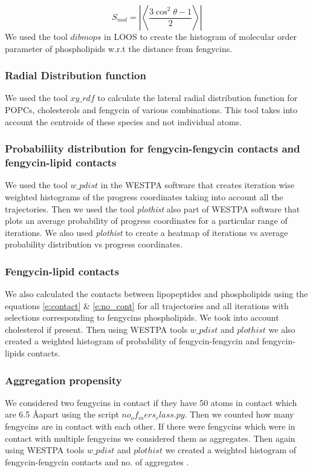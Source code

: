 \begin{equation}
\label{e:s_mol}
    S_{mol} = \left | \left \langle \frac{3 \cos^2 \theta -1}{2} \right \rangle \right |
\end{equation}
We used the tool ${dibmops}$ in LOOS to create the histogram of molecular order parameter of phospholipids w.r.t the distance from fengycins.

\subsubsection{Radial Distribution function}
\label{sss:rdf}
We used the tool ${xy\_rdf}$ to calculate the lateral radial distribution function for POPCs, cholesterols and fengycin of various combinations. This tool takes into account the centroids of these species and not individual atoms.

\subsubsection{Probabiliity distribution for fengycin-fengycin contacts and fengycin-lipid contacts}
\label{sss:prog_coord}
We used the tool ${w\_pdist}$ in the WESTPA software that creates 
iteration wise weighted histograms of the progress coordinates taking 
into account all the trajectories. Then we used the tool 
\textit{plothist} also part of WESTPA software that plots an average 
probability of progress coordinates  for a particular range of 
iterations. We also used \textit{plothist} to create a heatmap of 
iterations vs average probability distribution vs progress coordinates.

\subsubsection{Fengycin-lipid contacts}
\label{sss:fl}
We also calculated the contacts between lipopeptides and phospholipids using the equations 
\ref{e:contact} \& \ref{e:no_cont} for all trajectories and all 
iterations with selections corresponding to fengycins phospholipids. We took into account cholesterol if present. Then using WESTPA tools  ${w\_pdist}$ and $plothist$ we 
also created a weighted histogram of probability of fengycin-fengycin and 
fengycin-lipids contacts.

\subsubsection{Aggregation propensity}
\label{sss:na}
We considered two fengycins in contact if they have 50 atoms in contact 
which are 6.5 \AA apart using the script $no_of_mers_class.py$. Then we counted how many fengycins are in 
contact with each other. If there were fengycins which were in 
contact with multiple fengycins we considered them as aggregates. Then 
again using WESTPA tools  ${w\_pdist}$ and $plothist$ we 
created a weighted histogram of fengycin-fengycin contacts and 
no. of aggregates \cite{WESTPA2015,WESTPA_github}.

